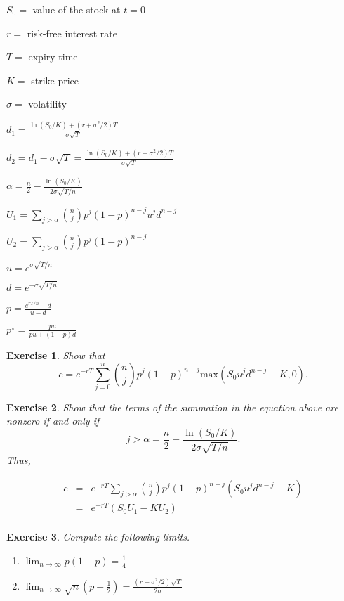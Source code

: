 \documentclass[letterpaper,10pt]{article}
\newcommand{\Sum}[2]{\ensuremath{\sum\limits}_{#1}^{#2}}
\newtheorem{ex}{Exercise}
\begin{document}
\begin{itemize}
\begin{multicols}{2}
\item $S_0=$ value of the stock at $t=0$
\item $r=$ risk-free interest rate
\item $T=$ expiry time
\item $K=$ strike price
\item $\sigma=$ volatility
\item $\displaystyle d_1=\frac{\ln(S_0/K)+(r+\sigma^2/2)T}{\sigma\sqrt{T}}$
\item $\displaystyle d_2=d_1-\sigma\sqrt{T}=\frac{\ln(S_0/K)+(r-\sigma^2/2)T}{\sigma\sqrt{T}}$
\item $\displaystyle\alpha=\frac{n}{2}-\frac{\ln(S_0/K)}{2\sigma\sqrt{T/n}}$
\item $\displaystyle U_1=\Sum{j>\alpha}{}{n\choose j}p^j(1-p)^{n-j}u^jd^{n-j}$
\item $\displaystyle U_2=\Sum{j>\alpha}{}{n\choose j}p^j(1-p)^{n-j}$
\item $\displaystyle u=e^{\sigma\sqrt{T/n}}$
\item $\displaystyle d=e^{-\sigma\sqrt{T/n}}$
\item $\displaystyle p=\frac{e^{rT/n}-d}{u-d}$
\item $\displaystyle p^{\star}=\frac{pu}{pu+(1-p)d}$
\end{multicols}
\end{itemize}


\begin{ex}
Show that $$c=e^{-rT}\Sum{j=0}{n}{n\choose j}p^j(1-p)^{n-j}\text{max}(S_0u^jd^{n-j}-K,0).$$
\end{ex}

\begin{ex} 
Show that the terms of the summation in the equation above are nonzero if and only if $$j>\alpha=\frac{n}{2}-\frac{\ln(S_0/K)}{2\sigma\sqrt{T/n}}.$$  Thus, 


\begin{eqnarray*}
c&=&e^{-rT}\Sum{j>\alpha}{}{n\choose j}p^j(1-p)^{n-j}(S_0u^jd^{n-j}-K)\\
&=&e^{-rT}(S_0U_1-KU_2)\\
\end{eqnarray*}
\end{ex}

\begin{ex}
Compute the following limits.  

\begin{enumerate}

\item $\displaystyle\lim_{n\rightarrow\infty}p(1-p)=\frac{1}{4}$

\item $\displaystyle\lim_{n\rightarrow\infty}\sqrt{n}(p-\frac{1}{2})=\frac{(r-\sigma^2/2)\sqrt{T}}{2\sigma}$

\end{enumerate}
\end{ex}
\end{document}
